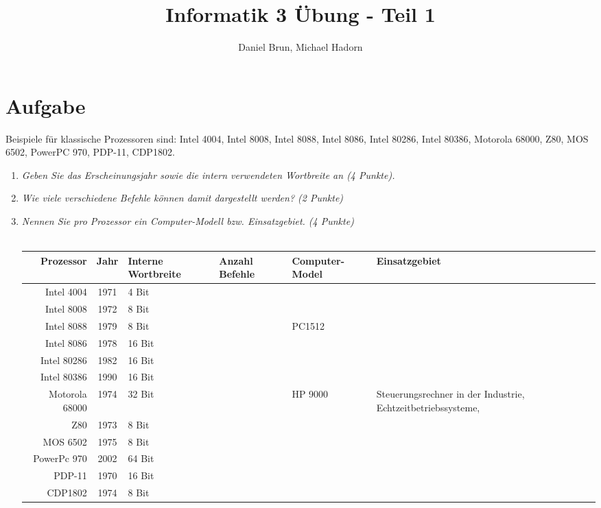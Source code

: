 \documentclass[10pt]{article}
\title{Informatik 3 Übung - Teil 1\vspace{-2ex}}
\author{Daniel Brun, Michael Hadorn\vspace{-2ex}}
\begin{document}
\maketitle

\section{Aufgabe}
Beispiele für klassische Prozessoren sind: Intel 4004, Intel 8008, Intel 8088, Intel 8086, Intel 80286, Intel 80386, Motorola 68000, Z80, MOS 6502, PowerPC 970, PDP-11, CDP1802.

\begin{enumerate}[label=\alph*)]
	\item 
	\textit{Geben Sie das Erscheinungsjahr sowie die intern verwendeten Wortbreite an (4 Punkte).}
	\item
	\textit{Wie viele verschiedene Befehle können damit dargestellt werden? (2 Punkte)}\\
	\item
	\textit{Nennen Sie pro Prozessor ein Computer-Modell bzw. Einsatzgebiet. (4 Punkte)}\\\\
	\begin{tabular}{r | c P{1.8cm} P{1.5cm} p{2cm} p{2cm} }
		Prozessor & Jahr & Interne Wortbreite & Anzahl Befehle & Computer-Model & Einsatzgebiet \\
		\hline
		Intel 4004 & 1971 & 4 Bit & & & \\
		Intel 8008 & 1972 & 8 Bit & & & \\
		Intel 8088 & 1979 & 8 Bit &   & PC1512 & \\
		Intel 8086 & 1978 & 16 Bit & & & \\
		Intel 80286 & 1982 & 16 Bit & & & \\
		Intel 80386 & 1990 & 16 Bit & & & \\
		Motorola 68000 & 1974 & 32 Bit & & HP 9000 & Steuerungsrechner in der Industrie, Echtzeitbetriebssysteme,  \\
		Z80 & 1973 & 8 Bit & & & \\
		MOS 6502 & 1975 & 8 Bit & & & \\
		PowerPc 970 & 2002 & 64 Bit & & & \\
		PDP-11 & 1970 & 16 Bit & & & \\
		CDP1802 & 1974 & 8 Bit & & & \\
	\end{tabular}
	
\end{enumerate}
\newpage
\end{document}
